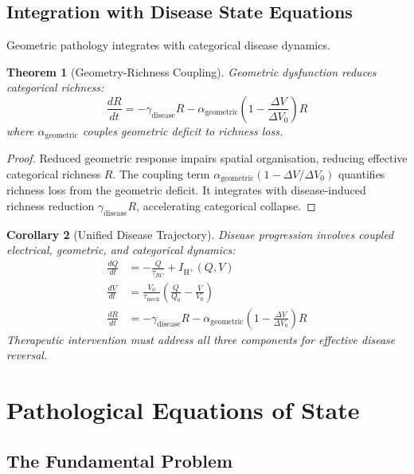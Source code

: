\documentclass[11pt,twocolumn,a4paper]{article}
\newtheorem{theorem}{Theorem}[section]
\newtheorem{corollary}[theorem]{Corollary}
\theoremstyle{definition}
\theoremstyle{remark}
\begin{document}
\subsection{Integration with Disease State Equations}

Geometric pathology integrates with categorical disease dynamics.

\begin{theorem}[Geometry-Richness Coupling]
\label{thm:geometry_richness}
Geometric dysfunction reduces categorical richness:
\begin{equation}
\frac{dR}{dt} = -\gamma_{\text{disease}} R - \alpha_{\text{geometric}} \left(1 - \frac{\Delta V}{\Delta V_0}\right) R
\end{equation}
where $\alpha_{\text{geometric}}$ couples geometric deficit to richness loss.
\end{theorem}

\begin{proof}
Reduced geometric response impairs spatial organisation, reducing effective categorical richness $R$. The coupling term $\alpha_{\text{geometric}}(1 - \Delta V/\Delta V_0)$ quantifies richness loss from the geometric deficit. It integrates with disease-induced richness reduction $\gamma_{\text{disease}} R$, accelerating categorical collapse.
\end{proof}

\begin{corollary}[Unified Disease Trajectory]
\label{cor:unified_trajectory}
Disease progression involves coupled electrical, geometric, and categorical dynamics:
\begin{align}
\frac{dQ}{dt} &= -\frac{Q}{\tau_{RC}} + I_{\text{H}^+}(Q, V) \\
\frac{dV}{dt} &= \frac{V_0}{\tau_{\text{mech}}} \left(\frac{Q}{Q_0} - \frac{V}{V_0}\right) \\
\frac{dR}{dt} &= -\gamma_{\text{disease}} R - \alpha_{\text{geometric}} \left(1 - \frac{\Delta V}{\Delta V_0}\right) R
\end{align}
Therapeutic intervention must address all three components for effective disease reversal.
\end{corollary}

\section{Pathological Equations of State}
\label{sec:pathological_eos}

\subsection{The Fundamental Problem}
\end{document}
